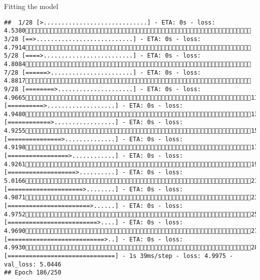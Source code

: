 \documentclass[
  ignorenonframetext,
]{beamer}
\begin{document}
\begin{frame}[fragile]{Fitting the model}
\begin{verbatim}
##  1/28 [>.............................] - ETA: 0s - loss: 4.5380 3/28 [==>...........................] - ETA: 0s - loss: 4.7914 5/28 [====>.........................] - ETA: 0s - loss: 4.8084 7/28 [======>.......................] - ETA: 0s - loss: 4.8817 9/28 [========>.....................] - ETA: 0s - loss: 4.966511/28 [==========>...................] - ETA: 0s - loss: 4.948013/28 [============>.................] - ETA: 0s - loss: 4.925515/28 [===============>..............] - ETA: 0s - loss: 4.919817/28 [=================>............] - ETA: 0s - loss: 4.926119/28 [===================>..........] - ETA: 0s - loss: 5.016621/28 [=====================>........] - ETA: 0s - loss: 4.987123/28 [=======================>......] - ETA: 0s - loss: 4.975225/28 [=========================>....] - ETA: 0s - loss: 4.969027/28 [===========================>..] - ETA: 0s - loss: 4.993028/28 [==============================] - 1s 39ms/step - loss: 4.9975 - val_loss: 5.0446
## Epoch 186/250

\end{verbatim}
\end{frame}
\end{document}
